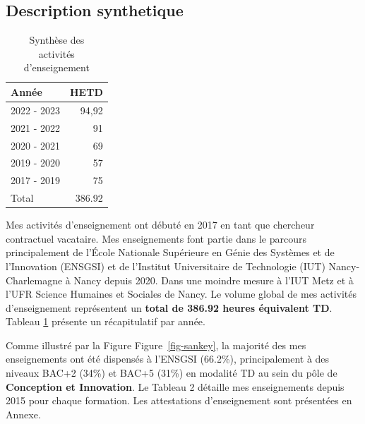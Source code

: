 \documentclass[
  11pt,
]{article}
\begin{document}
\hypertarget{description-synthetique}{%
\subsection{Description synthetique}\label{description-synthetique}}

\begin{table}
   \caption{\label{tbl-heures}Synthèse des\\activités d'enseignement}
   \begin{tabular}[t]{lr}
   \toprule
   Année & HETD\\
   \midrule
   2022 - 2023 & 94,92\\
   2021 - 2022 & 91\\
   2020 - 2021 & 69\\
   2019 - 2020 & 57\\
   2017 - 2019 & 75\\ \midrule
   Total & 386.92 \\
   \bottomrule
   \end{tabular}
\end{table}

Mes activités d'enseignement ont débuté en 2017 en tant que chercheur
contractuel vacataire. Mes enseignements font partie dans le parcours
principalement de l'École Nationale Supérieure en Génie des Systèmes et
de l'Innovation (ENSGSI) et de l'Institut Universitaire de Technologie
(IUT) Nancy-Charlemagne à Nancy depuis 2020. Dans une moindre mesure à
l'IUT Metz et à l'UFR Science Humaines et Sociales de Nancy. Le volume
global de mes activités d'enseignement représentent un \textbf{total de
386.92 heures équivalent TD}. Tableau \ref{tbl-heures} présente un
récapitulatif par année.

Comme illustré par la Figure Figure~\ref{fig-sankey}, la majorité des
mes enseignements ont été dispensés à l'ENSGSI (66.2\%), principalement
à des niveaux BAC+2 (34\%) et BAC+5 (31\%) en modalité TD au sein du
pôle de \textbf{Conception et Innovation}. Le Tableau 2 détaille mes
enseignements depuis 2015 pour chaque formation. Les attestations
d'enseignement sont présentées en Annexe.
\end{document}
